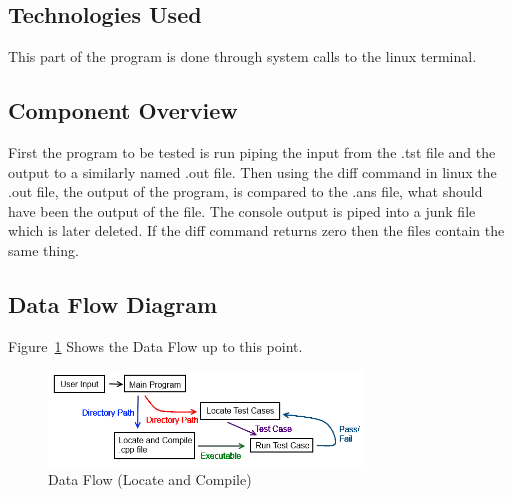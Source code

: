 \subsection{Technologies  Used}
This part of the program is done through system calls to the linux terminal. 

\subsection{Component  Overview}
First the program to be tested is run piping the input from the .tst file and the output to a similarly named .out file.
Then using the diff command in linux the .out file, the output of the program, is compared to the .ans file, what should
have been the output of the file.  The console output is piped into a junk file which is later deleted.  If the diff command
returns zero then the files contain the same thing.

\subsection{Data Flow Diagram}
Figure~\ref{DataFlow3} Shows the Data Flow up to this point.

\begin{figure}[tbh]
\begin{center}
\includegraphics[width=0.75\textwidth]{./DataFlow3}
\end{center}
\caption{Data Flow (Locate and Compile) \label{DataFlow3}}
\end{figure}


